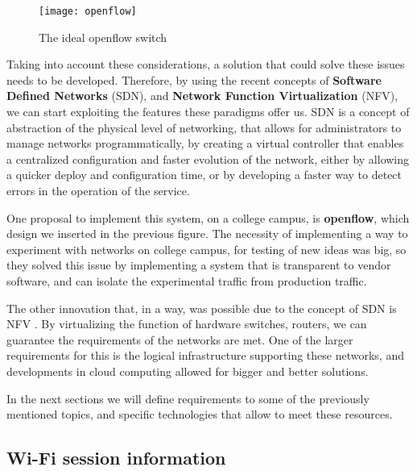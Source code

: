 \begin{figure}
    \centering
    \texttt{[image: openflow]}
    \caption{
        The ideal openflow switch \cite{mckeown_openflow:_2008}
    }
    \label{fig:my_label}
\end{figure}

\par Taking into account these considerations, a solution that could solve these issues needs to be developed. Therefore, by using the recent concepts of \textbf{ Software Defined Networks} (SDN), and \textbf{Network Function Virtualization} (NFV), we can start exploiting the features these paradigms offer us. SDN is a concept of abstraction of the physical level of networking, that allows for administrators to manage networks programmatically, by creating a virtual controller that enables a centralized configuration and faster evolution of the network, either by allowing a quicker deploy and configuration time, or by developing a faster way to detect errors in the operation of the service. 

\par One proposal to implement this system, on a college campus, is \textbf{openflow}, which design we inserted in the previous figure. The necessity of implementing a way to experiment with networks on college campus, for testing of new ideas was big, so they solved this issue by implementing a system that is transparent to vendor software, and can isolate the experimental traffic from production traffic. 

\par The other innovation that, in a way, was possible due to the concept of SDN is NFV \cite{schulz-zander_opensdwn:_2015}. By virtualizing the function of hardware switches, routers, we can guarantee the requirements of the networks are met. One of the larger requirements for this is the logical infrastructure supporting these networks, and developments in cloud computing allowed for bigger and better solutions. 

\par In the next sections we will define requirements to some of the previously mentioned topics, and specific technologies that allow to meet these resources. 

\subsection {Wi-Fi session information}
\hspace {5mm}

